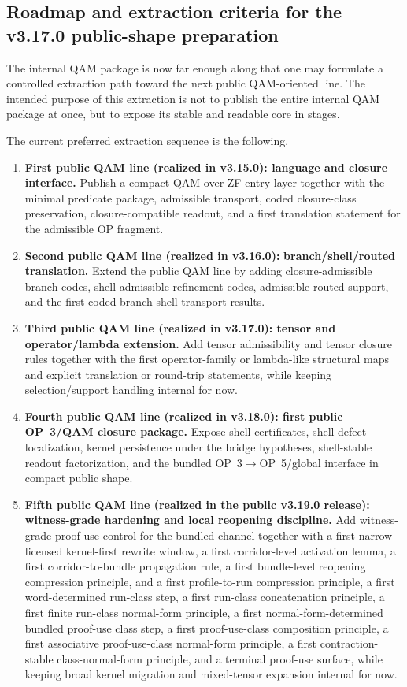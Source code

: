 \subsection*{Roadmap and extraction criteria for the v3.17.0 public-shape preparation}
The internal QAM package is now far enough along that one may formulate a controlled extraction path toward the next public QAM-oriented line. The intended purpose of this extraction is not to publish the entire internal QAM package at once, but to expose its stable and readable core in stages.

The current preferred extraction sequence is the following.
\begin{enumerate}[leftmargin=2em]
  \item \textbf{First public QAM line (realized in v3.15.0): language and closure interface.} Publish a compact QAM-over-ZF entry layer together with the minimal predicate package, admissible transport, coded closure-class preservation, closure-compatible readout, and a first translation statement for the admissible OP fragment.
  \item \textbf{Second public QAM line (realized in v3.16.0):} \textbf{branch/shell/routed translation.} Extend the public QAM line by adding closure-admissible branch codes, shell-admissible refinement codes, admissible routed support, and the first coded branch-shell transport results.
  \item \textbf{Third public QAM line (realized in v3.17.0): tensor and operator/lambda extension.} Add tensor admissibility and tensor closure rules together with the first operator-family or lambda-like structural maps and explicit translation or round-trip statements, while keeping selection/support handling internal for now.
  \item \textbf{Fourth public QAM line (realized in v3.18.0): first public OP~3/QAM closure package.} Expose shell certificates, shell-defect localization, kernel persistence under the bridge hypotheses, shell-stable readout factorization, and the bundled OP~3$\to$OP~5/global interface in compact public shape.
  \item \textbf{Fifth public QAM line (realized in the public v3.19.0 release): witness-grade hardening and local reopening discipline.} Add witness-grade proof-use control for the bundled channel together with a first narrow licensed kernel-first rewrite window, a first corridor-level activation lemma, a first corridor-to-bundle propagation rule, a first bundle-level reopening compression principle, and a first profile-to-run compression principle, a first word-determined run-class step, a first run-class concatenation principle, a first finite run-class normal-form principle, a first normal-form-determined bundled proof-use class step, a first proof-use-class composition principle, a first associative proof-use-class normal-form principle, a first contraction-stable class-normal-form principle, and a terminal proof-use surface, while keeping broad kernel migration and mixed-tensor expansion internal for now.
\end{enumerate}

